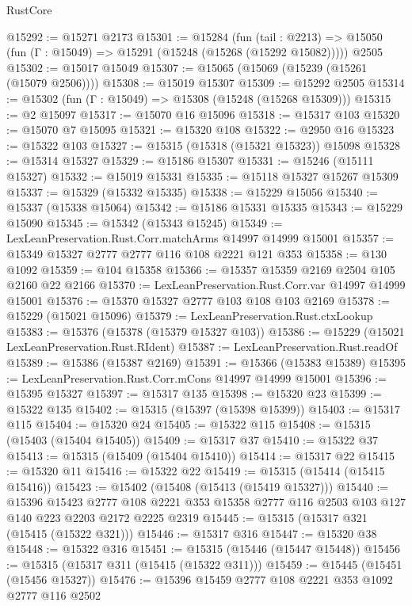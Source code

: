 \begin{lexlean}{RustCore}
\begin{coremodule}
@15292 := @15271 @2173
@15301 := @15284
    (fun (tail : @2213) => @15050 (fun (Γ : @15049) => @15291 (@15248 (@15268 (@15292 @15082)))))
    @2505
@15302 := @15017 @15049
@15307 := @15065 (@15069 (@15239 (@15261 (@15079 @2506))))
@15308 := @15019 @15307
@15309 := @15292 @2505
@15314 := @15302 (fun (Γ : @15049) => @15308 (@15248 (@15268 @15309)))
@15315 := @2 @15097
@15317 := @15070 @16 @15096
@15318 := @15317 @103
@15320 := @15070 @7 @15095
@15321 := @15320 @108
@15322 := @2950 @16
@15323 := @15322 @103
@15327 := @15315 (@15318 (@15321 @15323)) @15098
@15328 := @15314 @15327
@15329 := @15186 @15307
@15331 := @15246 (@15111 @15327)
@15332 := @15019 @15331
@15335 := @15118 @15327 @15267 @15309
@15337 := @15329 (@15332 @15335)
@15338 := @15229 @15056
@15340 := @15337 (@15338 @15064)
@15342 := @15186 @15331 @15335
@15343 := @15229 @15090
@15345 := @15342 (@15343 @15245)
@15349 := LexLeanPreservation.Rust.Corr.matchArms @14997 @14999 @15001
@15357 := @15349 @15327 @2777 @2777 @116 @108 @2221 @121 @353
@15358 := @130 @1092
@15359 := @104 @15358
@15366 := @15357 @15359 @2169 @2504 @105 @2160 @22 @2166
@15370 := LexLeanPreservation.Rust.Corr.var @14997 @14999 @15001
@15376 := @15370 @15327 @2777 @103 @108 @103 @2169
@15378 := @15229 (@15021 @15096)
@15379 := LexLeanPreservation.Rust.ctxLookup
@15383 := @15376 (@15378 (@15379 @15327 @103))
@15386 := @15229 (@15021 LexLeanPreservation.Rust.RIdent)
@15387 := LexLeanPreservation.Rust.readOf
@15389 := @15386 (@15387 @2169)
@15391 := @15366 (@15383 @15389)
@15395 := LexLeanPreservation.Rust.Corr.mCons @14997 @14999 @15001
@15396 := @15395 @15327
@15397 := @15317 @135
@15398 := @15320 @23
@15399 := @15322 @135
@15402 := @15315 (@15397 (@15398 @15399))
@15403 := @15317 @115
@15404 := @15320 @24
@15405 := @15322 @115
@15408 := @15315 (@15403 (@15404 @15405))
@15409 := @15317 @37
@15410 := @15322 @37
@15413 := @15315 (@15409 (@15404 @15410))
@15414 := @15317 @22
@15415 := @15320 @11
@15416 := @15322 @22
@15419 := @15315 (@15414 (@15415 @15416))
@15423 := @15402 (@15408 (@15413 (@15419 @15327)))
@15440 := @15396
    @15423
    @2777
    @108
    @2221
    @353
    @15358
    @2777
    @116
    @2503
    @103
    @127
    @140
    @223
    @2203
    @2172
    @2225
    @2319
@15445 := @15315 (@15317 @321 (@15415 (@15322 @321)))
@15446 := @15317 @316
@15447 := @15320 @38
@15448 := @15322 @316
@15451 := @15315 (@15446 (@15447 @15448))
@15456 := @15315 (@15317 @311 (@15415 (@15322 @311)))
@15459 := @15445 (@15451 (@15456 @15327))
@15476 := @15396
    @15459
    @2777
    @108
    @2221
    @353
    @1092
    @2777
    @116
    @2502

\end{coremodule}
\end{lexlean}
